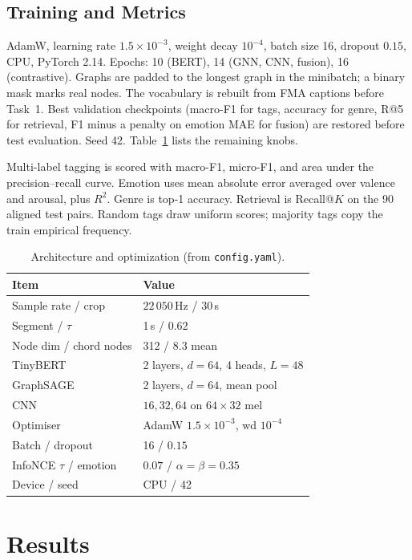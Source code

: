\documentclass[conference]{IEEEtran}
\begin{document}
\FloatBarrier

\subsection{Training and Metrics}
AdamW, learning rate $1.5\times 10^{-3}$, weight decay $10^{-4}$, batch size 16, dropout $0.15$, CPU, PyTorch 2.14. Epochs: 10 (BERT), 14 (GNN, CNN, fusion), 16 (contrastive). Graphs are padded to the longest graph in the minibatch; a binary mask marks real nodes. The vocabulary is rebuilt from FMA captions before Task~1. Best validation checkpoints (macro-F1 for tags, accuracy for genre, R@5 for retrieval, F1 minus a penalty on emotion MAE for fusion) are restored before test evaluation. Seed 42. Table~\ref{tab:hp} lists the remaining knobs.

Multi-label tagging is scored with macro-F1, micro-F1, and area under the precision--recall curve. Emotion uses mean absolute error averaged over valence and arousal, plus $R^2$. Genre is top-1 accuracy. Retrieval is Recall@$K$ on the 90 aligned test pairs. Random tags draw uniform scores; majority tags copy the train empirical frequency.

\begin{table}[t]
\caption{Architecture and optimization (from \texttt{config.yaml}).}
\label{tab:hp}
\centering
\renewcommand{\arraystretch}{1.12}
\setlength{\tabcolsep}{4pt}
\begin{tabularx}{\columnwidth}{@{}lX@{}}
\toprule
Item & Value \\
\midrule
Sample rate / crop & $22\,050$\,Hz / 30\,s \\
Segment / $\tau$ & 1\,s / $0.62$ \\
Node dim / chord nodes & 312 / $8.3$ mean \\
TinyBERT & 2 layers, $d{=}64$, 4 heads, $L{=}48$ \\
GraphSAGE & 2 layers, $d{=}64$, mean pool \\
CNN & $16,32,64$ on $64\times 32$ mel \\
Optimiser & AdamW $1.5\times 10^{-3}$, wd $10^{-4}$ \\
Batch / dropout & 16 / $0.15$ \\
InfoNCE $\tau$ / emotion & $0.07$ / $\alpha=\beta=0.35$ \\
Device / seed & CPU / 42 \\
\bottomrule
\end{tabularx}
\end{table}

\section{Results}
\end{document}
